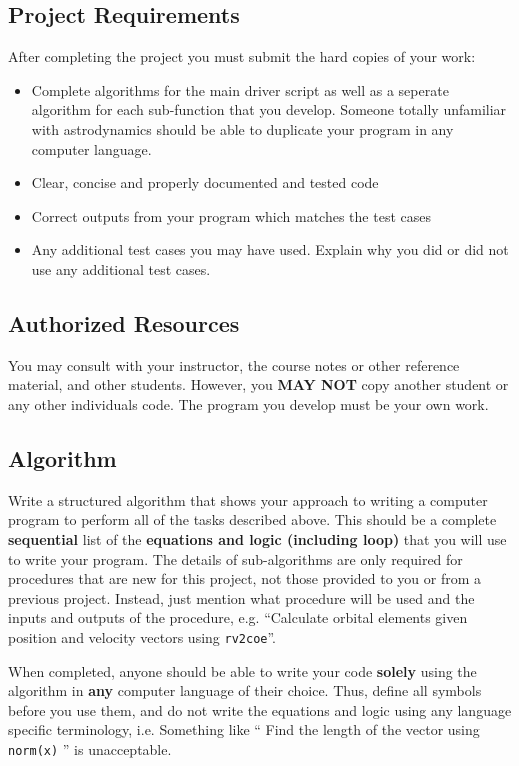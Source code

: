 \documentclass[11pt, reqno]{article}    %
\begin{document}
\subsection*{Project Requirements}
After completing the project you must submit the hard copies of your work:
\begin{itemize}
    \item Complete algorithms for the main driver script as well as a seperate algorithm for each sub-function that you develop.
        Someone totally unfamiliar with astrodynamics should be able to duplicate your program in any computer language.
    \item Clear, concise and properly documented and tested code
    \item Correct outputs from your program which matches the test cases
    \item Any additional test cases you may have used. 
        Explain why you did or did not use any additional test cases.
\end{itemize}

\subsection*{Authorized Resources}
You may consult with your instructor, the course notes or other reference material, and other students. 
However, you \textbf{MAY NOT} copy another student or any other individuals code. 
The program you develop must be your own work.

\subsection*{Algorithm}

Write a structured algorithm that shows your approach to writing a computer program to perform all of the tasks described above.
This should be a complete \textbf{sequential} list of the \textbf{equations and logic (including loop)} that you will use to write your program.
The details of sub-algorithms are only required for procedures that are new for this project, not those provided to you or from a previous project.
Instead, just mention what procedure will be used and the inputs and outputs of the procedure, e.g. ``Calculate orbital elements given position and velocity vectors using \texttt{rv2coe}''.

When completed, anyone should be able to write your code \textbf{solely} using the algorithm in \textbf{any} computer language of their choice.
Thus, define all symbols before you use them, and do not write the equations and logic using any language specific terminology, i.e. Something like `` Find the length of the vector using \texttt{norm(x)} '' is unacceptable.
\end{document}
